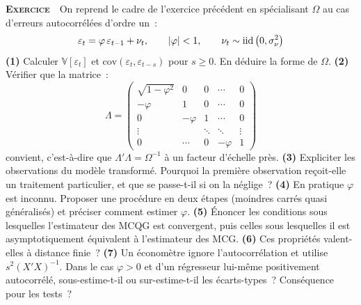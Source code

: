 \documentclass[10pt,a4paper,notitlepage]{article}
\newcounter{xnumber}
\newcommand{\exercice}{\refstepcounter{xnumber}\textsc{\textbf{Exercice}} \textbf{\thexnumber}\,\,}
\newcommand{\question}[1]{\textbf{(#1)}}
\begin{document}
\bigskip

\exercice\label{ex:ar1-cochrane} On reprend le cadre de l'exercice précédent en spécialisant $\Omega$
au cas d'erreurs autocorrélées d'ordre un~:
\[
  \varepsilon_t = \varphi\,\varepsilon_{t-1} + \nu_t, \qquad |\varphi|<1,
  \qquad \nu_t\sim\mathrm{iid}\left(0,\sigma_{\nu}^2\right)
\]
\question{1} Calculer $\mathbb V[\varepsilon_t]$ et
$\mathrm{cov}(\varepsilon_t,\varepsilon_{t-s})$ pour $s\geq 0$. En déduire la
forme de $\Omega$. \question{2} Vérifier que la matrice~:
\[
  \Lambda =
  \begin{pmatrix}
    \sqrt{1-\varphi^2} & 0 & 0 &\cdots & 0\\
    -\varphi & 1 & 0 & \cdots & 0\\
    0 & -\varphi & 1 & \cdots & 0\\
    \vdots & & \ddots & \ddots & \vdots\\
    0 & \cdots & 0 & -\varphi & 1
  \end{pmatrix}
\]
convient, c'est-à-dire que $\Lambda'\Lambda = \Omega^{-1}$ à un facteur
d'échelle près. \question{3} Expliciter les observations du modèle transformé.
Pourquoi la première observation reçoit-elle un traitement particulier, et que
se passe-t-il si on la néglige~? \question{4} En pratique $\varphi$ est inconnu.
Proposer une procédure en deux étapes (moindres carrés quasi généralisés) et
préciser comment estimer $\varphi$. \question{5} Énoncer les conditions sous
lesquelles l'estimateur des MCQG est convergent, puis celles sous lesquelles il
est asymptotiquement équivalent à l'estimateur des MCG. \question{6} Ces
propriétés valent-elles à distance finie~? \question{7} Un économètre ignore
l'autocorrélation et utilise $s^2(X'X)^{-1}$. Dans le cas $\varphi>0$ et d'un
régresseur lui-même positivement autocorrélé, sous-estime-t-il ou sur-estime-t-il
les écarts-types~? Conséquence pour les tests~?\newline

\bigskip
\end{document}
